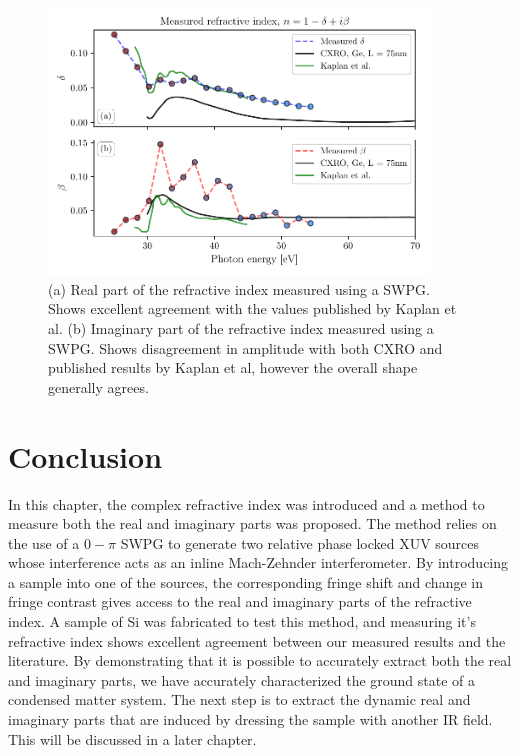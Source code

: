 \begin{figure}
	\centering
	\includegraphics[width=0.9\textwidth]{figures/refractive_index/ge_refractive.pdf}
	\caption[Measured real and imaginary part of the refractive index of Ge]{(a) Real part of the refractive index measured using a SWPG.  Shows excellent agreement with the values published by Kaplan et al.\cite{kaplanRetrievalComplexvaluedRefractive2019} (b) Imaginary part of the refractive index measured using a SWPG. Shows disagreement in amplitude with both CXRO and published results by Kaplan et al, however the overall shape generally agrees.}
	\label{fig:measured_delta_beta_ge}
\end{figure}

\section{Conclusion}
In this chapter, the complex refractive index was introduced and a method to measure both the real and imaginary parts was proposed. The method relies on the use of a $0-\pi$ SWPG to generate two relative phase locked XUV sources whose interference acts as an inline Mach-Zehnder interferometer.  By introducing a sample into one of the sources, the corresponding fringe shift and change in fringe contrast gives access to the real and imaginary parts of the refractive index.  A sample of Si was fabricated to test this method, and measuring it's refractive index shows excellent agreement between our measured results and the literature. By demonstrating that it is possible to accurately extract both the real and imaginary parts, we have accurately characterized the ground state of a condensed matter system.  The next step is to extract the dynamic real and imaginary parts that are induced by dressing the sample with another IR field.  This will be discussed in a later chapter.



